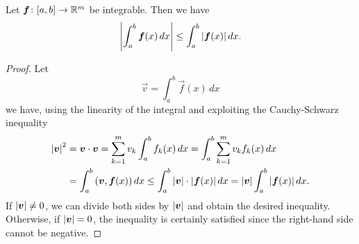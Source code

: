 \begin{theorem}\label{teo:tipo_jensen}
\label{th:stima_modulo_integrale}%
\mymark{*}%
Let $\boldsymbol f\colon [a,b]\to {\mathbb R}^m$ be integrable. Then we have
\[
  {\left|\int_a^b \boldsymbol f(x)\, dx\right|} \le \int_a^b {\left|\boldsymbol f(x)\right|}\, dx.
\]
\end{theorem}
%
\begin{proof}
Let
\[
 \vec v = \int_a^b \vec f(x)\, dx
\]
we have, using the linearity of the integral
and exploiting the Cauchy-Schwarz inequality
\begin{align*}
  {\left|\boldsymbol v\right|}^2
  &= \boldsymbol v \cdot \boldsymbol v
   = \sum_{k=1}^m v_k \int_a^b f_k(x)\, dx
   = \int_a^b \sum_{k=1}^m v_k f_k(x)\, dx \\
  &= \int_a^b {\left( \boldsymbol v, \boldsymbol f(x) \right)}\, dx
  \le \int_a^b {\left|\boldsymbol v\right|}\cdot {\left|\boldsymbol f(x)\right|}\, dx
  = {\left|\boldsymbol v\right|} \int_a^b {\left|\boldsymbol f(x)\right|}\, dx.
\end{align*}
If ${\left|\boldsymbol v\right|}\neq 0$, we can divide both sides by ${\left|\boldsymbol v\right|}$ and
obtain the desired inequality.
Otherwise, if ${\left|\boldsymbol v\right|}=0$, the inequality is certainly satisfied since
the right-hand side cannot be negative.
\end{proof}